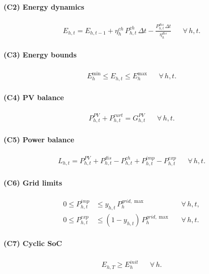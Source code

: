 \documentclass{article}
\begin{document}
\paragraph{(C2) Energy dynamics}
\begin{align}
  E_{h,t} = E_{h,t-1}
  + \eta^{ch}_h\,P^{ch}_{h,t}\,\Delta t
  - \frac{P^{dis}_{h,t}\,\Delta t}{\eta^{dis}_h}
  && \forall\,h,t.
\end{align}

\paragraph{(C3) Energy bounds}
\begin{align}
  E^{\min}_h \le E_{h,t} \le E^{\max}_h && \forall\,h,t.
\end{align}

\paragraph{(C4) PV balance}
\begin{align}
  P^{PV}_{h,t} + P^{curt}_{h,t} = G^{PV}_{h,t} && \forall\,h,t.
\end{align}

\paragraph{(C5) Power balance}
\begin{align}
  L_{h,t} = P^{PV}_{h,t} + P^{dis}_{h,t} - P^{ch}_{h,t}
           + P^{imp}_{h,t} - P^{exp}_{h,t} && \forall\,h,t.
\end{align}

\paragraph{(C6) Grid limits}
\begin{align}
  0 \le P^{imp}_{h,t} &\le y_{h,t}\,P^{grid,\max}_h   && \forall\,h,t, \\
  0 \le P^{exp}_{h,t} &\le (1-y_{h,t})\,P^{grid,\max}_h && \forall\,h,t.
\end{align}

\paragraph{(C7) Cyclic SoC}
\begin{align}
  E_{h,T} \ge E^{init}_h && \forall\,h.
\end{align}
\end{document}
